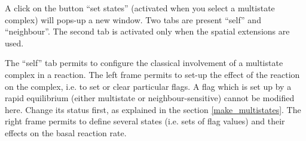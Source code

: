  A click on the button
``set states'' (activated when you select a multistate complex) will pops-up a
new window. Two tabs are present ``self'' and ``neighbour''. The second tab is
activated only when the spatial extensions are used. 

The ``self'' tab permits to configure the classical involvement of a multistate
complex in a reaction.  The left frame permits to set-up the effect of the
reaction on the complex, i.e. to set or clear particular flags. A flag which is
set up by a rapid equilibrium (either multistate or neighbour-sensitive) cannot
be modified here. Change its status first, as explained in the section
\ref{make_multistates}.  The right frame permits to define several states (i.e.
sets of flag values) and their effects on the basal reaction rate.  

